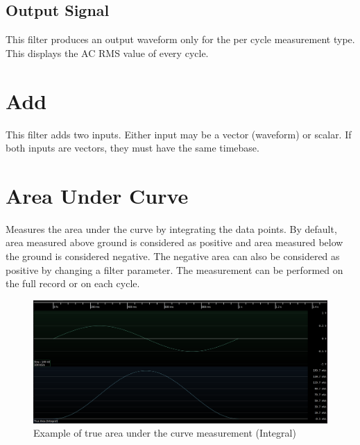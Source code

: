 \subsection{Output Signal}

This filter produces an output waveform only for the per cycle measurement type. This displays the AC RMS value of every cycle.

\pagebreak
\section{Add}
\label{filter:add}

This filter adds two inputs. Either input may be a vector (waveform) or scalar. If both inputs are vectors, they must
have the same timebase.

\pagebreak
\section{Area Under Curve}
\label{filter:AreaUnderCurve}

Measures the area under the curve by integrating the data points. By default, area measured above ground is considered
as positive and area measured below the ground is considered negative. The negative area can also be considered as positive
by changing a filter parameter. The measurement can be performed on the full record or on each cycle.

\begin{figure}[h]
\centering
\includegraphics[width=16cm]{images/filters/true-area.png}
\caption{Example of true area under the curve measurement (Integral)}
\end{figure}

